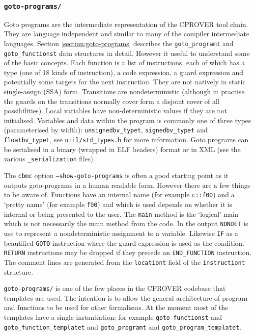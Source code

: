 \documentclass{article}
\newcommand{\dir}[1]{\texttt{#1}}
\newcommand{\file}[1]{\texttt{#1}}
\newcommand{\code}[1]{\texttt{#1}}
\newcommand{\prog}[1]{\texttt{#1}}
\begin{document}
\subsubsection{\dir{goto-programs/}}

Goto programs are the intermediate representation of the CPROVER tool
chain.  They are language independent and similar to many of the
compiler intermediate languages.  Section \ref{section:goto-programs}
describes the \code{goto\_programt} and \code{goto\_functionst} data
structures in detail.  However it useful to understand some of the
basic concepts.  Each function is a list of instructions, each of
which has a type (one of 18 kinds of instruction), a code expression,
a guard expression and potentially some targets for the next
instruction.  They are not natively in static single-assign (SSA)
form.  Transitions are nondeterministic (although in practise the
guards on the transitions normally cover form a disjoint cover of all
possibilities).  Local variables have non-deterministic values if they
are not initialised.  Variables and data within the program is
commonly one of three types (parameterised by width):
\code{unsignedbv\_typet}, \code{signedbv\_typet} and
\code{floatbv\_typet}, see \file{util/std\_types.h} for more
information. Goto programs can be serialised in a binary (wrapped in
ELF headers) format or in XML (see the various \code{\_serialization}
files).


The \prog{cbmc} option \code{--show-goto-programs} is often a
good starting point as it outputs goto-programs in a human
readable form.  However there are a few things to be aware of.
Functions have an internal name (for example \code{c::f00}) and a
`pretty name' (for example \code{f00}) and which is used depends on
whether it is internal or being presented to the user.  The
\code{main} method is the `logical' main which is not necessarily the
main method from the code.  In the output \code{NONDET} is use to
represent a nondeterministic assignment to a variable.  Likewise
\code{IF} as a beautified \code{GOTO} instruction where the guard
expression is used as the condition.  \code{RETURN} instructions may
be dropped if they precede an \code{END\_FUNCTION} instruction.  The
comment lines are generated from the \code{locationt} field of the
\code{instructiont} structure.

\dir{goto-programs/} is one of the few places in the CPROVER codebase
that templates are used.  The intention is to allow the general
architecture of program and functions to be used for other
formalisms.  At the moment most of the templates have a single
instantiation; for example \code{goto\_functionst} and
\code{goto\_function\_templatet} and \code{goto\_programt} and \code{goto\_program\_templatet}.
\end{document}

